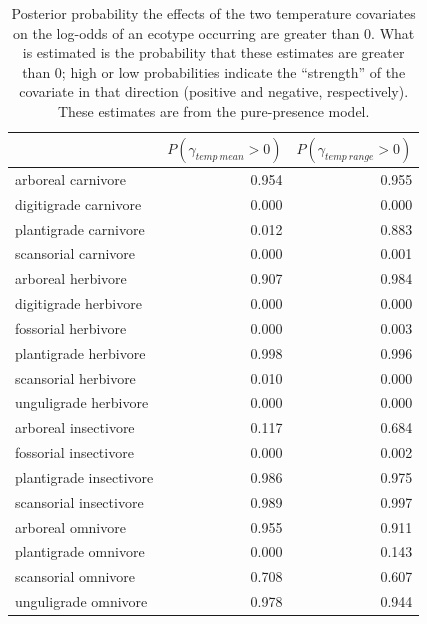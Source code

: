 \documentclass[12pt,letterpaper]{article}
\begin{document}
\begin{table}[ht]
  \centering
  \caption[Posterior probablity of effects of temperature on occurrence]{Posterior probability the effects of the two temperature covariates on the log-odds of an ecotype occurring are greater than 0. What is estimated is the probability that these estimates are greater than 0; high or low probabilities indicate the ``strength'' of the covariate in that direction (positive and negative, respectively). These estimates are from the pure-presence model.}
  \label{tab:occur_temp}
  \begin{tabular}{ l r r }
    \hline
    & \(P(\gamma_{temp\ mean} > 0)\) & \(P(\gamma_{temp\ range} > 0)\) \\ 
    \hline
    arboreal carnivore & 0.954 & 0.955 \\ 
    digitigrade carnivore & 0.000 & 0.000 \\ 
    plantigrade carnivore & 0.012 & 0.883 \\ 
    scansorial carnivore & 0.000 & 0.001 \\ 
    arboreal herbivore & 0.907 & 0.984 \\ 
    digitigrade herbivore & 0.000 & 0.000 \\ 
    fossorial herbivore & 0.000 & 0.003 \\ 
    plantigrade herbivore & 0.998 & 0.996 \\ 
    scansorial herbivore & 0.010 & 0.000 \\ 
    unguligrade herbivore & 0.000 & 0.000 \\ 
    arboreal insectivore & 0.117 & 0.684 \\ 
    fossorial insectivore & 0.000 & 0.002 \\ 
    plantigrade insectivore & 0.986 & 0.975 \\ 
    scansorial insectivore & 0.989 & 0.997 \\ 
    arboreal omnivore & 0.955 & 0.911 \\ 
    plantigrade omnivore & 0.000 & 0.143 \\ 
    scansorial omnivore & 0.708 & 0.607 \\ 
    unguligrade omnivore & 0.978 & 0.944 \\ 
    \hline
  \end{tabular}
\end{table}
\end{document}
